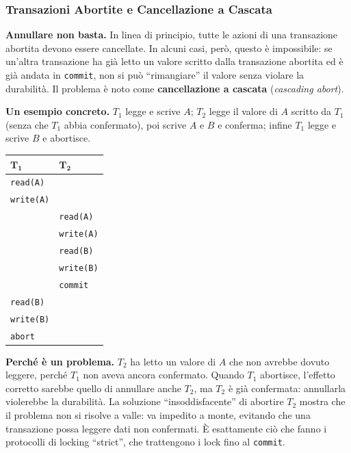 \documentclass[12pt]{extarticle}
\begin{document}
\subsubsection{Transazioni Abortite e Cancellazione a Cascata}

\noindent \textbf{Annullare non basta.} In linea di principio, tutte le azioni di una transazione abortita devono essere cancellate. In alcuni casi, però, questo è impossibile: se un'altra transazione ha già letto un valore scritto dalla transazione abortita ed è già andata in \texttt{commit}, non si può ``rimangiare'' il valore senza violare la durabilità. Il problema è noto come \textbf{cancellazione a cascata} (\textit{cascading abort}).

\medskip
\noindent \textbf{Un esempio concreto.} $T_1$ legge e scrive $A$; $T_2$ legge il valore di $A$ scritto da $T_1$ (senza che $T_1$ abbia confermato), poi scrive $A$ e $B$ e conferma; infine $T_1$ legge e scrive $B$ e abortisce.

\begin{center}
\small
\begin{tabular}{@{}ll@{}}
    \toprule
    $\boldsymbol{T_1}$ & $\boldsymbol{T_2}$ \\
    \midrule
    \texttt{read(A)}  &      \\
    \texttt{write(A)} &      \\
     & \texttt{read(A)}  \\
     & \texttt{write(A)} \\
     & \texttt{read(B)}  \\
     & \texttt{write(B)} \\
     & \texttt{commit}   \\
    \texttt{read(B)}  &      \\
    \texttt{write(B)} &      \\
    \texttt{abort}    &      \\
    \bottomrule
\end{tabular}
\end{center}

\noindent \textbf{Perché è un problema.} $T_2$ ha letto un valore di $A$ che non avrebbe dovuto leggere, perché $T_1$ non aveva ancora confermato. Quando $T_1$ abortisce, l'effetto corretto sarebbe quello di annullare anche $T_2$, ma $T_2$ è già confermata: annullarla violerebbe la durabilità. La soluzione ``insoddisfacente'' di abortire $T_2$ mostra che il problema non si risolve a valle: va impedito a monte, evitando che una transazione possa leggere dati non confermati. È esattamente ciò che fanno i protocolli di locking ``strict'', che trattengono i lock fino al \texttt{commit}.
\end{document}
